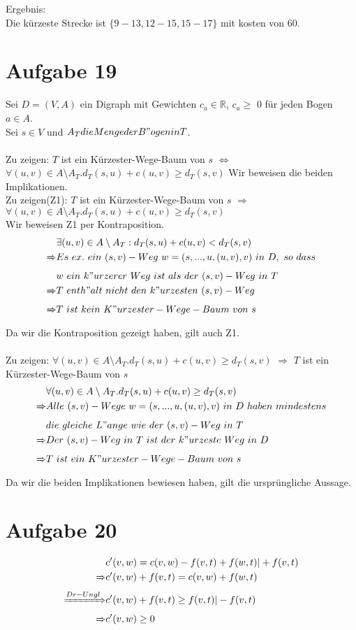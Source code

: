 \documentclass[a4paper,10pt,german]{scrartcl}
\begin{document}
Ergebnis:\\

Die k\"urzeste Strecke ist $\{9-13,12-15,15-17\} $ mit kosten von 60.
\section{Aufgabe 19}
Sei $D = (V,A)$ ein Digraph mit Gewichten $c_a \in \mathbb{R}$, $c_a \ge$ 0 f\"ur jeden Bogen $a \in A$.\\
Sei $s \in V$ und $A_T die Menge der B"ogen in T$.\\
\\
Zu zeigen: $T$ ist ein K\"urzester-Wege-Baum von $s$ $\Leftrightarrow$ $\forall (u,v) \in A \setminus A_T. d_T(s,u) + c(u,v) \ge d_T(s,v)$
Wir beweisen die beiden Implikationen.\\
Zu zeigen(Z1): $T$ ist ein Kürzester-Wege-Baum von $s$ $\Rightarrow$ $\forall (u,v) \in A \setminus A_T. d_T(s,u) + c(u,v) \ge d_T(s,v)$\\
Wir beweisen Z1 per Kontraposition.
\begin{align*}
	&\exists (u,v) \in A \setminus A_T: d_T (s,u) + c(u,v) < d_T (s,v)\\
	\xRightarrow{} &Es\ ex.\ ein\ (s,v)-Weg\ w = (s,...,u,(u,v),v)\ in\ D,\ so\ dass\\
	&w\ ein\ k"urzerer\ Weg\ ist\ als\ der\ (s,v)-Weg\ in\ T\\
	\xRightarrow{} &T\ enth"alt\ nicht\ den\ k"urzesten\ (s,v)-Weg\\
	\xRightarrow{} &T\ ist\ kein\ K"urzester-Wege-Baum\ von\ s\\
\end{align*}
Da wir die Kontraposition gezeigt haben, gilt auch Z1.\\
\\
Zu zeigen: $\forall (u,v) \in A \setminus A_T. d_T(s,u) + c(u,v) \ge d_T(s,v)$ $\Rightarrow$ $T$ ist ein Kürzester-Wege-Baum von $s$\\ 
\begin{align*}
	&\forall (u,v) \in A \setminus A_T. d_T (s,u) + c(u,v) \ge d_T (s,v)\\
	\xRightarrow{} &Alle\ (s,v)-Wege\ w = (s,...,u,(u,v),v)\ in\ D\ haben\ mindestens\\
	&die\ gleiche\ L"ange\ wie\ der\ (s,v)-Weg\ in\ T\\
	\xRightarrow{} &Der\ (s,v)-Weg\ in\ T\ ist\ der\ k"urzeste\ Weg\ in\ D \\
	\xRightarrow{} &T\ ist\ ein\ K"urzester-Wege-Baum\ von\ s\\
\end{align*}
Da wir die beiden Implikationen bewiesen haben, gilt die ursprüngliche Aussage.
\section{Aufgabe 20}
\begin{align}
	&c'(v,w) = c(v,w) - f(v,t) + f(w,t) | + f(v,t)\\
	\xRightarrow{} &c'(v,w) + f(v,t) = c(v,w) + f(w,t)\\
	\xRightarrow{Dr-Ungl} &c'(v,w) + f(v,t) \ge f(v,t) | - f(v,t)\\
	\xRightarrow{} &c'(v,w) \ge 0
\end{align}
\end{document}
